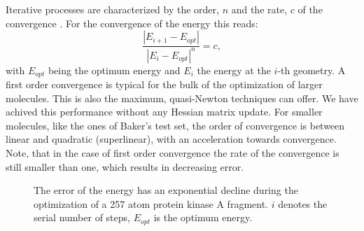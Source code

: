 \documentclass[prl,aps,twocolumn,showpacs,twocolumngrid,superbib]{revtex4}
\begin{document}
Iterative processes are characterized by the order, $n$
and the rate, $c$ of the convergence \cite{Quarteroni}. 
For the convergence of the energy this reads:
\begin{equation}
\frac{|E_{i+1}-E_{opt}|}{|E_{i}-E_{opt}|^n}=c ,
\end{equation}
with $E_{opt}$ being the optimum energy and $E_{i}$ the energy
at the $i$-th geometry.
A first order convergence is typical for the bulk of the optimization
of larger molecules. This is also the maximum, quasi-Newton techniques 
can offer. We have achived this performance without any Hessian
matrix update.
For smaller molecules, like the ones of Baker's
test set, the order of convergence is between linear and quadratic
(superlinear), with an acceleration towards convergence.
Note, that in the case
of first order convergence the rate of the convergence is still
smaller than one, which results in decreasing error.
\begin{figure}[h]
\caption{
\small  
The error of the energy has an exponential decline during
the optimization of a 257 atom protein kinase A fragment. 
$i$ denotes the serial number of steps,
$E_{opt}$ is the optimum energy.
\label{logn-logde}
}
\end{figure}
%
%
%
%
\end{document}
